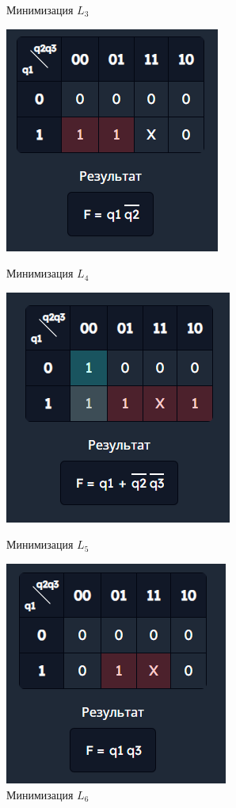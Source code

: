 \documentclass[10pt,a4paper,final]{article} %
\begin{document}
\begin{figure}[htpb]
\begin{minipage}{0.25\textwidth}
		\caption{Минимизация $L_3$}
	\end{minipage}
	\hfill
	\begin{minipage}{0.25\textwidth}
		\includegraphics[scale=0.7]{img/L3.png}
		\caption{Минимизация $L_4$}
	\end{minipage}
	\hfill
	\begin{minipage}{0.25\textwidth}
		\includegraphics[scale=0.7]{img/L5.png}
		\caption{Минимизация $L_5$}
	\end{minipage}
	\hfill
	\begin{minipage}{0.25\textwidth}
		\includegraphics[scale=0.7]{img/L6.png}
		\caption{Минимизация $L_6$}
	\end{minipage}
	\label{L} 
\end{figure}
\end{document}
